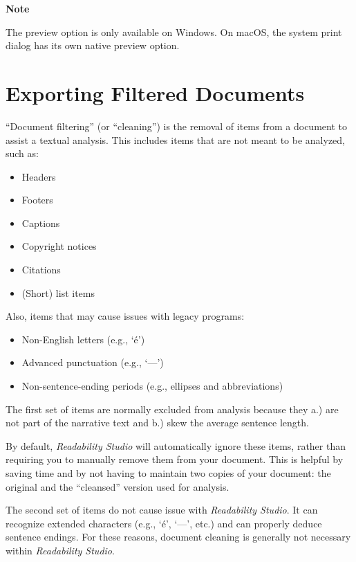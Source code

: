 \documentclass[
]{book}
\providecommand{\tightlist}{%
  \setlength{\itemsep}{0pt}\setlength{\parskip}{0pt}}
\newenvironment{notesection}
    {
    \begin{tcolorbox}[colframe=mediumblue,colback=lightblue,coltext=mediumblue,arc=3mm]
    \faLightbulb[regular] \textbf{Note} \newline
    }
    {
    \end{tcolorbox}
    }
\theoremstyle{definition}
\theoremstyle{definition}
\theoremstyle{definition}
\theoremstyle{definition}
\theoremstyle{remark}
\begin{document}
\begin{notesection}
The preview option is only available on Windows. On macOS, the system print dialog has its own native preview option.

\end{notesection}

\hypertarget{filtering-export}{%
\section{Exporting Filtered Documents}\label{filtering-export}}

``Document filtering'' (or ``cleaning'') is the removal of items from a document to assist a textual analysis. This includes items that are not meant to be analyzed, such as:

\begin{itemize}
\tightlist
\item
  Headers
\item
  Footers
\item
  Captions
\item
  Copyright notices
\item
  Citations
\item
  (Short) list items
\end{itemize}

Also, items that may cause issues with legacy programs:

\begin{itemize}
\tightlist
\item
  Non-English letters (e.g., `é')
\item
  Advanced punctuation (e.g., `---')
\item
  Non-sentence-ending periods (e.g., ellipses and abbreviations)
\end{itemize}

The first set of items are normally excluded from analysis because they a.) are not part of the narrative text and b.) skew the average sentence length.

By default, \emph{Readability Studio} will automatically ignore these items, rather than requiring you to manually remove them from your document. This is helpful by saving time and by not having to maintain two copies of your document: the original and the ``cleansed'' version used for analysis.

The second set of items do not cause issue with \emph{Readability Studio}. It can recognize extended characters (e.g., `é', `---', etc.) and can properly deduce sentence endings. For these reasons, document cleaning is generally not necessary within \emph{Readability Studio}.
\end{document}
